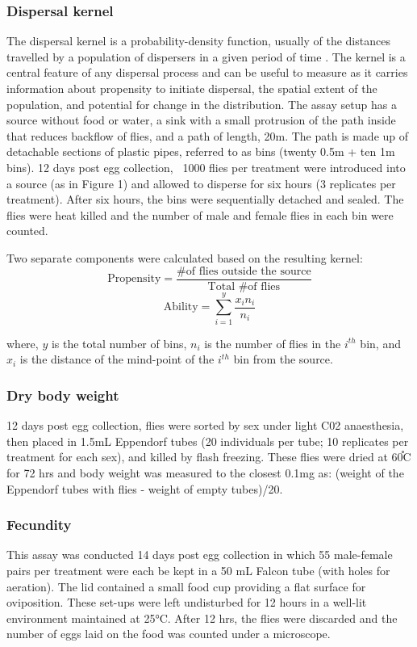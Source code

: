 \documentclass[12pt,onecolumn,twoside]{article}
\begin{document}
	\subsubsection{Dispersal kernel}
	The dispersal kernel is a probability-density function, usually of the distances travelled by a population of dispersers in a given period of time \citep{Clobert2012}. The kernel is a central feature of any dispersal process and can be useful to measure as it carries information about propensity to initiate dispersal, the spatial extent of the population, and potential for change in the distribution.
	The assay setup has a source without food or water, a sink with a small protrusion of the path inside that reduces backflow of flies, and a path of length, 20m. The path is made up of detachable sections of plastic pipes, referred to as bins (twenty 0.5m + ten 1m bins). 12 days post egg collection, ~1000 flies per treatment were introduced into a source (as in Figure 1)  and allowed to disperse for six hours (3 replicates per treatment). After six hours, the bins were sequentially detached and sealed. The flies were heat killed and the number of male and female flies in each bin were counted.

	Two separate components were calculated based on the resulting kernel:
	\[
		\text{Propensity} = \frac{\text{\# of flies outside the source}}{\text{Total \# of flies}}
	\]
	\[
		\text{Ability} = \sum_{i=1}^{y} \frac{x_{i}n_{i}}{n_{i}}
	\]

	where, $y$ is the total number of bins, $n_{i}$ is the number of flies in the $i^{th}$ bin, and $x_{i}$ is the distance of the mind-point of the $i^{th}$ bin from the source.

	\subsubsection{Dry body weight}
	12 days post egg collection, flies were sorted by sex under light C02 anaesthesia, then placed in 1.5mL Eppendorf tubes (20 individuals per tube; 10 replicates per treatment for each sex), and killed by flash freezing. These flies were dried at 60֯C for 72 hrs and body weight was measured to the closest 0.1mg as: (weight of the Eppendorf tubes with flies - weight of empty tubes)/20.
	\subsubsection{Fecundity}
	This assay was conducted 14 days post egg collection in which 55 male-female pairs per treatment were each be kept in a 50 mL Falcon tube (with holes for aeration). The lid contained a small food cup providing a flat surface for oviposition. These set-ups were left undisturbed for 12 hours in a well-lit environment maintained at 25°C. After 12 hrs, the flies were discarded and the number of eggs laid on the food was counted under a microscope.
\end{document}

